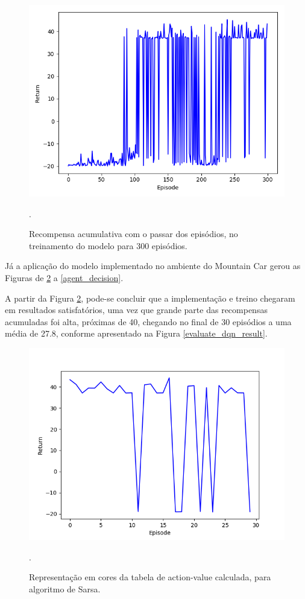 \documentclass[conference]{IEEEtran}
\begin{document}
\begin{figure}[htbp]
\centering
\centerline{\includegraphics[scale=0.3]{imagens/train/15.png}}
\caption{Recompensa acumulativa com o passar dos episódios, no treinamento do modelo para 300 episódios.}.
\label{train/15}
\end{figure} 

	Já a aplicação do modelo implementado no ambiente do Mountain Car gerou as Figuras de \ref{dqn_evaluation} a \ref{agent_decision}.
	
	A partir da Figura \ref{dqn_evaluation}, pode-se concluir que a implementação e treino chegaram em resultados satisfatórios, uma vez que grande parte das recompensas acumuladas foi alta, próximas de 40, chegando no final de 30 episódios a uma média de 27.8, conforme apresentado na Figura \ref{evaluate_dqn_result}.
	
\begin{figure}[htbp]
\centering
\centerline{\includegraphics[scale=0.5]{imagens/dqn_evaluation.png}}
\caption{Representação em cores da tabela de action-value calculada, para algoritmo de Sarsa.}.
\label{dqn_evaluation}
\end{figure}
\end{document}
